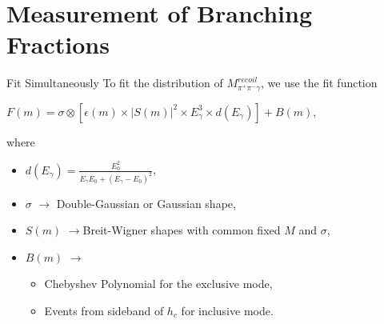 \documentclass{beamer}
\begin{document}
\section{Measurement of Branching Fractions}
\begin{frame}{Fit Simultaneously}
    To fit the distribution of $M^{recoil}_{\pi^+\pi^-\gamma}$, we use the fit function\\
    \begin{center}
        $F(m) = \sigma\otimes[\epsilon(m)\times|S(m)|^2\times E^3_{\gamma}\times d(E_{\gamma})] + B(m)$,
    \end{center}
    where
    \begin{itemize}
        \item $d(E_{\gamma}) = \frac{E^2_0}{E_{\gamma}E_0 + ( E_{\gamma}-E_0 )^2}$,\\
        \item $\sigma$ $\rightarrow$ Double-Gaussian or Gaussian shape,
        \item $S(m)$ $\rightarrow $Breit-Wigner shapes with common fixed $M$ and $\sigma$,
        \item $B(m)$ $\rightarrow $
            \begin{itemize}
                \item Chebyshev Polynomial for the exclusive mode,
                \item Events from sideband of $h_c$ for inclusive mode.
            \end{itemize}
    \end{itemize}
\end{frame}
\end{document}
